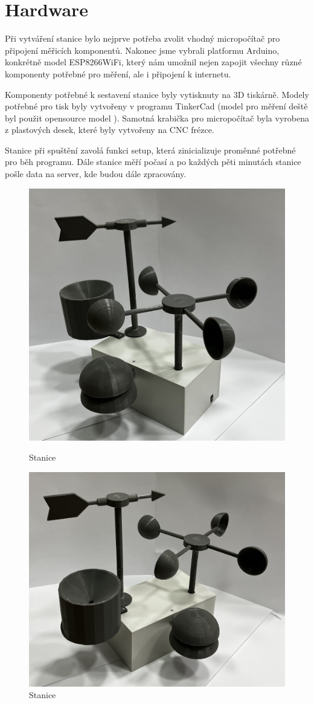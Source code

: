 \section{Hardware}
Při vytváření stanice bylo nejprve potřeba zvolit vhodný micropočítač pro připojení měřicích komponentů. Nakonec jsme vybrali platformu Arduino,
konkrétně model ESP8266WiFi, který nám umožnil nejen zapojit všechny různé komponenty potřebné pro měření, ale i připojení k internetu.

Komponenty potřebné k sestavení stanice byly vytisknuty na 3D tiskárně. Modely potřebné pro tisk byly vytvořeny v programu TinkerCad
(model pro měření deště byl použit opensource model \cite{mereni_deste}). Samotná krabička pro micropočítač byla vyrobena z plastových desek,
které byly vytvořeny na CNC frézce.  

Stanice při spuštění zavolá funkci setup, která zinicializuje proměnné potřebné pro běh programu. 
Dále stanice měří počasí a po každých pěti minutách stanice pošle data na server, kde budou dále zpracovány.

\begin{figure}[!htb]
   \begin{minipage}{0.48\textwidth}
     \centering
     \includegraphics[width=.7\linewidth]{images/stanice0.jpg}
     \caption{Stanice}
   \end{minipage}\hfill
   \begin{minipage}{0.5\textwidth}
     \centering
     \includegraphics[width=.7\linewidth]{images/stanice1.jpg}
     \caption{Stanice}
   \end{minipage}
\end{figure}
